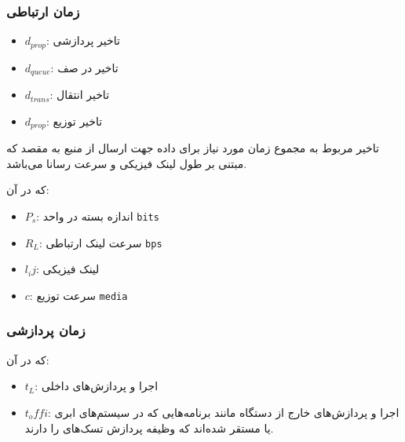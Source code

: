 \subsubsection{زمان ارتباطی}


\begin{itemize}
    \item $d_{prop}$: تاخیر پردازشی
    \item $d_{queue}$: تاخیر در صف
    \item $d_{trans}$: تاخیر انتقال
    \item $d_{prop}$: تاخیر توزیع
\end{itemize}

تاخیر مربوط به  مجموع زمان مورد نیاز برای داده جهت ارسال از منبع
به مقصد که مبتنی بر طول لینک فیزیکی و سرعت رسانا می‌باشد.


که در آن:

\begin{itemize}
    \item $P_s$: اندازه بسته در واحد \texttt{bits}
    \item $R_L$: سرعت لینک ارتباطی \texttt{bps}
\end{itemize}


\begin{itemize}
    \item $l_ij$: لینک فیزیکی
    \item $c$: سرعت توزیع \texttt{media}
\end{itemize}

\subsubsection{زمان پردازشی}


که در آن:

\begin{itemize}
    \item $t_L$: اجرا و پردازش‌های داخلی
    \item $t_offi$: اجرا و پردازش‌های خارج از دستگاه  مانند برنامه‌هایی
    که در سیستم‌های ابری یا  مستقر شده‌اند که وظیفه پردازش تسک‌های
     را دارند.
\end{itemize}

